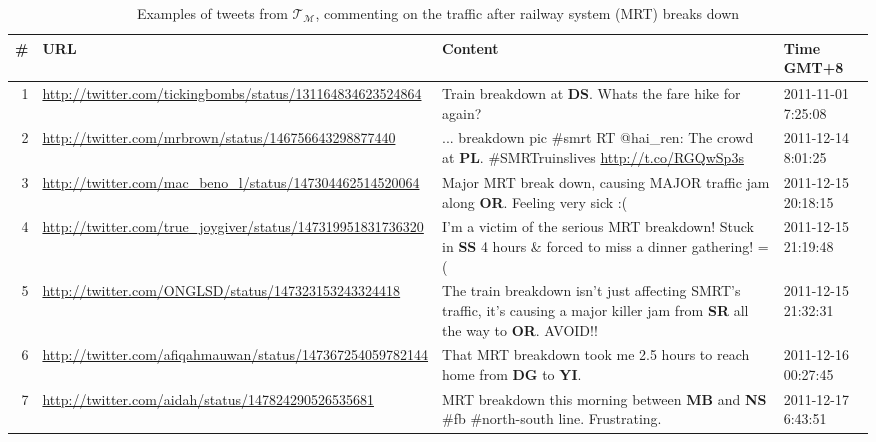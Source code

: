 \documentclass[conference]{IEEEtran.1.8}
\begin{document}
\begin{table}[htb]
	\centering
	\caption{Examples of tweets from $\mathcal{T}_{\mathcal{M}}$, commenting on the traffic after railway system (MRT) breaks down}
	\label{tbl:tweets}
	\begin{tabular}{|r|p{4cm}|p{9.5cm}|p{2.1cm}|}
		\hline
		\# & URL & Content & Time GMT+8 \\
		\hline
		1 & \url{http://twitter.com/tickingbombs/status/131164834623524864} & Train breakdown at \textbf{DS}. Whats the fare hike for again? & 2011-11-01 7:25:08  \\
		\hline
		2 & \url{http://twitter.com/mrbrown/status/146756643298877440} & ... breakdown pic \#smrt RT @hai\_ren: The crowd at \textbf{PL}. \#SMRTruinslives \url{http://t.co/RGQwSp3s} & 2011-12-14 8:01:25 \\
		\hline
		3 & \url{http://twitter.com/mac_beno_l/status/147304462514520064} & Major MRT break down, causing MAJOR traffic jam along \textbf{OR}. Feeling very sick :( & 2011-12-15 20:18:15 \\
		\hline
		4 & \url{http://twitter.com/true_joygiver/status/147319951831736320} & I'm a victim of the serious MRT breakdown! Stuck in \textbf{SS} 4 hours \& forced to miss a dinner gathering! =( & 2011-12-15 21:19:48 \\
		\hline
		5 & \url{http://twitter.com/ONGLSD/status/147323153243324418} & The train breakdown isn't just affecting SMRT's traffic, it's causing a major killer jam from \textbf{SR} all the way to \textbf{OR}. AVOID!! & 2011-12-15 21:32:31 \\
		\hline
		6 & \url{http://twitter.com/afiqahmauwan/status/147367254059782144}	& That MRT breakdown took me 2.5 hours to reach home from \textbf{DG} to \textbf{YI}. & 2011-12-16 00:27:45 \\
		\hline
		7 & \url{http://twitter.com/aidah/status/147824290526535681} & MRT breakdown this morning between \textbf{MB} and \textbf{NS} \#fb \#north-south line. Frustrating. & 2011-12-17 6:43:51 \\
		\hline
	\end{tabular}
\end{table}
\end{document}
